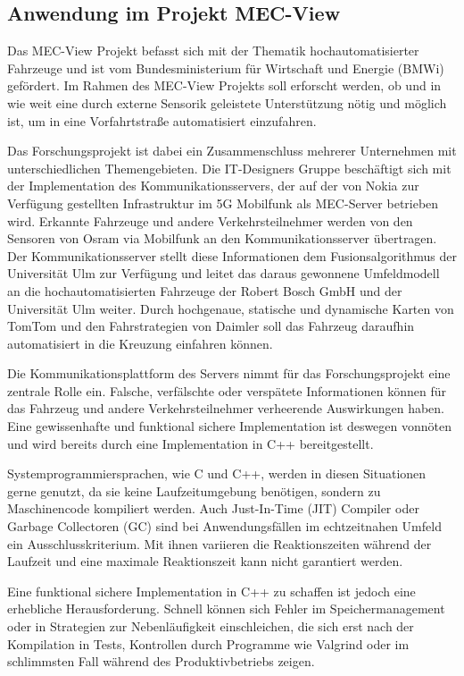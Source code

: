 \begin{multicols}{2}
\subsection*{Anwendung im Projekt MEC-View}

Das MEC-View Projekt befasst sich mit der Thematik hochautomatisierter Fahrzeuge und ist vom Bundesministerium für Wirtschaft und Energie (BMWi) gefördert.
Im Rahmen des MEC-View Projekts soll erforscht werden, ob und in wie weit eine durch externe Sensorik geleistete Unterstützung nötig und möglich ist, um in eine Vorfahrtstraße automatisiert einzufahren.

\bildIII

Das Forschungsprojekt ist dabei ein Zusammenschluss mehrerer Unternehmen mit unterschiedlichen Themengebieten. Die IT-Designers Gruppe beschäftigt sich mit der Implementation des Kommunikationsservers, der auf der von Nokia zur Verfügung gestellten
Infrastruktur im 5G Mobilfunk als MEC-Server betrieben wird. Erkannte Fahrzeuge und
andere Verkehrsteilnehmer werden von den Sensoren von Osram via Mobilfunk an den
Kommunikationsserver übertragen. Der Kommunikationsserver stellt diese Informationen
dem Fusionsalgorithmus der Universität Ulm zur Verfügung und leitet das daraus gewonnene Umfeldmodell an die hochautomatisierten Fahrzeuge der Robert Bosch GmbH und der Universität
Ulm weiter. Durch hochgenaue, statische und dynamische Karten von TomTom und den
Fahrstrategien von Daimler soll das Fahrzeug daraufhin automatisiert in die Kreuzung
einfahren können.

Die Kommunikationsplattform des Servers nimmt für das Forschungsprojekt eine zentrale Rolle ein.
Falsche, verfälschte oder verspätete Informationen können für das Fahrzeug und andere Verkehrsteilnehmer verheerende Auswirkungen haben.
Eine gewissenhafte und funktional sichere Implementation ist deswegen vonnöten und wird bereits durch eine Implementation in C++ bereitgestellt.

Systemprogrammiersprachen, wie C und C++, werden in diesen Situationen gerne genutzt, da sie keine Laufzeitumgebung benötigen, sondern zu Maschinencode kompiliert werden.
Auch Just-In-Time (JIT) Compiler oder Garbage Collectoren (GC) sind bei Anwendungsfällen im echtzeitnahen Umfeld ein Ausschlusskriterium.
Mit ihnen variieren die Reaktionszeiten während der Laufzeit und eine maximale Reaktionszeit kann nicht garantiert werden.

Eine funktional sichere Implementation in C++ zu schaffen ist jedoch eine erhebliche Herausforderung.
Schnell können sich Fehler im Speichermanagement oder in Strategien zur Nebenläufigkeit einschleichen, die sich erst nach der Kompilation in Tests, Kontrollen durch Programme wie Valgrind oder im schlimmsten Fall während des Produktivbetriebs zeigen.


\end{multicols}
